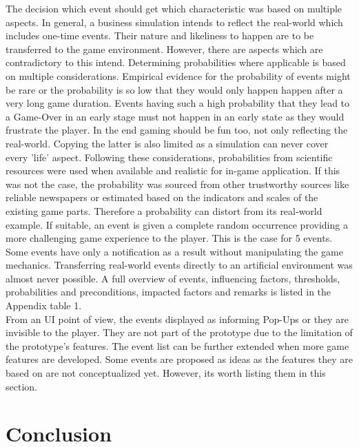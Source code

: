 \documentclass[11pt,titlepage,oneside,openany]{book}
\begin{document}
The decision which event should get which characteristic was based on multiple aspects. In general, a business simulation intends to reflect the real-world which includes one-time events. Their nature and likeliness to happen are to be transferred to the game environment. However, there are aspects which are contradictory to this intend.
Determining probabilities where applicable is based on multiple considerations. Empirical evidence for the probability of events might be rare or the probability is so low that they would only happen happen after a very long game duration. Events having such a high probability that they lead to a Game-Over in an early stage must not happen in an early state as they would frustrate the player. In the end gaming should be fun too, not only reflecting the real-world. Copying the latter is also limited as a simulation can never cover every 'life' aspect.  Following these considerations, probabilities from scientific resources were used when available and realistic for in-game application. If this was not the case, the probability was sourced from other trustworthy sources like reliable newspapers or estimated based on the indicators and scales of the existing game parts. Therefore a probability can distort from its real-world example. If suitable, an event is given a complete random occurrence providing a more challenging game experience to the player. This is the case for 5 events. Some events have only a notification as a result without manipulating the game mechanics. Transferring real-world events directly to an artificial environment was almost never possible. A full overview of events, influencing factors, thresholds, probabilities and preconditions, impacted factors and remarks is listed in the Appendix table 1. \\
From an UI point of view, the events displayed as informing Pop-Ups or they are invisible to the player. They are not part of the prototype due to the limitation of the prototype's features. The event list can be further extended when more game features are developed. Some events are proposed as ideas as the features they are based on are not conceptualized yet. However, its worth listing them in this section. 




\pagebreak




\chapter{Conclusion}
\label{cha:conclusion}
\end{document}

